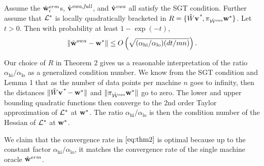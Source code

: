 \documentclass[thesis.tex]{subfiles}
\newcommand{\qhi}{\alpha_\text{hi}}
\newcommand{\qlo}{\alpha_\text{lo}}
\begin{document}
\begin{theorem}
\label{theorem:wowafull}
Assume the $\hat{\mathbf w}^{erm}_i$s, $\hat{\mathbf{v}}^{\textit{owa,full}}$, and $\hat{\mathbf{v}}^{\textit{owa}}$ all satisfy the SGT condition.
Further assume that $\mathcal{L}^*$ is locally quadratically bracketed in $R=\{\hat W\mathbf{v}^{\textit{*}},\pi_{{{\hat {{\mathcal W}}^{\textit{owa}}}}}{\mathbf w^{*}}\}$.
Let $t>0$.
Then with probability at least $1-\exp(-t)$, 
\begin{equation}
    \label{eq:thm2}
\ltwo{\wowa-\wstar} \le O\left(
\sqrt{({\qhi}/{\qlo})({dt}/{mn})}
\right)
.
\end{equation}
\end{theorem}

Our choice of $R$ in Theorem 2 gives us a reasonable interpretation of the ratio $\qhi/\qlo$ as a generalized condition number.
We know from the SGT condition and Lemma 1 that as the number of data points per machine $n$ goes to infinity,
then the distances ${\lVert {\hat W\mathbf{v}^{\textit{*}}-{\mathbf w^{*}}} \rVert}$ and ${\lVert {\pi_{{{\hat {{\mathcal W}}^{\textit{owa}}}}}{\mathbf w^{*}}} \rVert}$ go to zero.
The lower and upper bounding quadratic functions then converge to the 2nd order Taylor approximation of $\mathcal{L}^*$ at ${\mathbf w^{*}}$.
The ratio $\qhi/\qlo$ is then the condition number of the Hessian of $\mathcal{L}^*$ at ${\mathbf w^{*}}$.

We claim that the convergence rate in $\eqref{eq:thm2}$ is optimal because up to the constant factor $\qhi/\qlo$, it matches the convergence rate of the single machine oracle $\hat{\mathbf w}^{erm}$.


\end{document}

